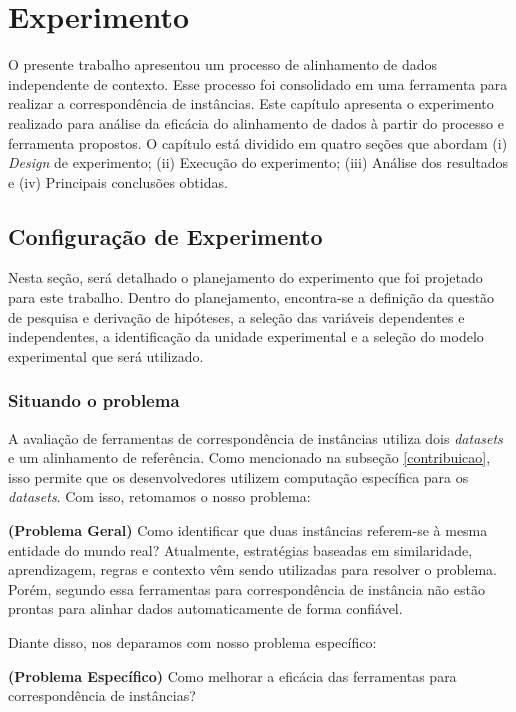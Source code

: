\chapter{Experimento}
\label{cap:experimento}
O presente trabalho apresentou um processo de alinhamento de dados independente de contexto. Esse processo foi consolidado em uma ferramenta para realizar a correspondência de instâncias. Este capítulo apresenta o experimento realizado para análise da eficácia do alinhamento de dados à partir do processo e ferramenta propostos. O capítulo está dividido em quatro seções que abordam (i) \textit{Design} de experimento; (ii) Execução do experimento; (iii) Análise dos resultados e (iv) Principais conclusões obtidas.

\section{Configuração de Experimento}
Nesta seção, será detalhado o planejamento do experimento que foi projetado para este trabalho. Dentro do planejamento, encontra-se a definição da questão de pesquisa e derivação de hipóteses, a seleção das variáveis dependentes e independentes, a identificação da unidade experimental e a seleção do modelo experimental que será utilizado.

\subsection{Situando o problema}
A avaliação de ferramentas de correspondência de instâncias utiliza dois \textit{datasets} e um alinhamento de referência. Como mencionado na subseção \ref{contribuicao}, isso permite que os desenvolvedores utilizem computação específica para os \textit{datasets}. Com isso, retomamos o nosso problema:

\textbf{(Problema Geral)} Como identificar que duas instâncias referem-se à mesma entidade do mundo real?
Atualmente, estratégias baseadas em similaridade, aprendizagem, regras e contexto \cite{castano2011ontology} vêm sendo utilizadas para resolver o problema. Porém, segundo  essa ferramentas para correspondência de instância não estão prontas para alinhar dados automaticamente de forma confiável. 

Diante disso, nos deparamos com nosso problema específico: 

\textbf{(Problema Específico)} Como melhorar a eficácia das ferramentas para correspondência de instâncias?

